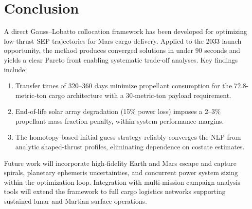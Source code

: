 \documentclass{aiaa-tc}
\begin{document}
\section{Conclusion}
\label{sec:conclusion}

A direct Gauss–Lobatto collocation framework has been developed for optimizing
low-thrust SEP trajectories for Mars cargo delivery.  Applied to the 2033 launch
opportunity, the method produces converged solutions in under 90 seconds and
yields a clear Pareto front enabling systematic trade-off analyses.  Key
findings include:

\begin{enumerate}
  \item Transfer times of 320–360 days minimize propellant consumption for the
        72.8-metric-ton cargo architecture with a 30-metric-ton payload requirement.
  \item End-of-life solar array degradation (15\% power loss) imposes a 2–3\%
        propellant mass fraction penalty, within system performance margins.
  \item The homotopy-based initial guess strategy reliably converges the NLP from
        analytic shaped-thrust profiles, eliminating dependence on costate estimates.
\end{enumerate}

Future work will incorporate high-fidelity Earth and Mars escape and capture
spirals, planetary ephemeris uncertainties, and concurrent power system sizing
within the optimization loop.  Integration with multi-mission campaign
analysis tools will extend the framework to full cargo logistics networks
supporting sustained lunar and Martian surface operations.
\end{document}
